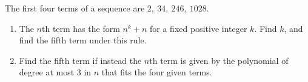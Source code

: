 The first four terms of a sequence are $2,\ 34,\ 246,\ 1028$.
\begin{enumerate}
\item[(a)] The $n$th term has the form $n^k+n$ for a fixed positive integer $k$. Find $k$, and find the fifth term under this rule.
\item[(b)] Find the fifth term if instead the $n$th term is given by the polynomial of degree at most $3$ in $n$ that fits the four given terms.
\end{enumerate}
